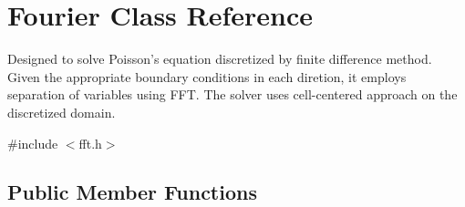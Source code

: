 \hypertarget{classFourier}{\section{Fourier Class Reference}
\label{classFourier}
}


Designed to solve Poisson's equation discretized by finite difference method. Given the appropriate boundary conditions in each diretion, it employs separation of variables using F\-F\-T. The solver uses cell-\/centered approach on the discretized domain.  




{\ttfamily \#include $<$fft.\-h$>$}

\subsection*{Public Member Functions}
